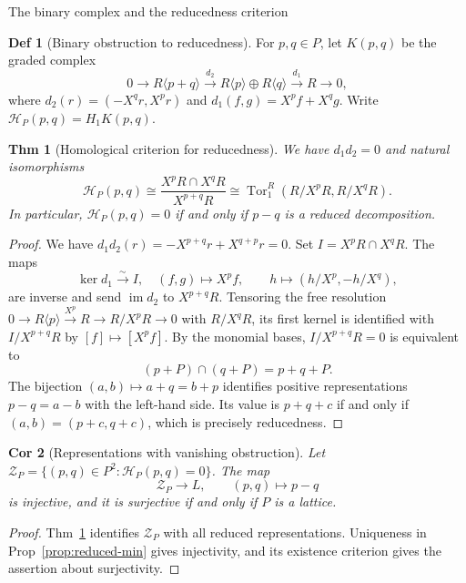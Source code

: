 \documentclass[10pt,letterpaper]{amsart}
\makeatletter
\numberwithin{equation}{section}
\newtheorem{thm}{Thm}[section]
\newtheorem{cor}[thm]{Cor}
\theoremstyle{definition}
\newtheorem{defn}{Def}[section]
\newcommand{\Tor}{\operatorname{Tor}}
\newcommand{\sh}[1]{\langle #1\rangle}
\newcommand{\HH}{\mathcal H}
\def\subsection{\@startsection{subsection}{2}
  \z@{.9\linespacing\@plus.3\linespacing}{.4\linespacing}
  {\normalfont\fontsize{11.5}{14}\selectfont\bfseries\boldmath\raggedright}}
\makeatother
\begin{document}
\subsection{The binary complex and the reducedness criterion}
\begin{defn}[Binary obstruction to reducedness]\label{def:binary}
For $p,q\in P$, let $K(p,q)$ be the graded complex
\[
0\longrightarrow R\sh{p+q}
\xrightarrow{\ d_2\ }R\sh p\oplus R\sh q
\xrightarrow{\ d_1\ }R\longrightarrow0,
\]
where $d_2(r)=(-X^qr,X^pr)$ and $d_1(f,g)=X^pf+X^qg$. Write $\HH_P(p,q)=H_1K(p,q)$.
\end{defn}

\begin{thm}[Homological criterion for reducedness]\label{thm:binary}
We have $d_1d_2=0$ and natural isomorphisms
\[
\HH_P(p,q)\cong
\frac{X^pR\cap X^qR}{X^{p+q}R}
\cong\Tor_1^R(R/X^pR,R/X^qR).
\]
In particular, $\HH_P(p,q)=0$ if and only if $p-q$ is a reduced decomposition.
\end{thm}
\begin{proof}
We have $d_1d_2(r)=-X^{p+q}r+X^{q+p}r=0$. Set $I=X^pR\cap X^qR$. The maps
\[
\ker d_1\xrightarrow{\sim} I,\quad(f,g)\mapsto X^pf,
\qquad h\mapsto(h/X^p,-h/X^q),
\]
are inverse and send $\operatorname{im}d_2$ to $X^{p+q}R$.
Tensoring the free resolution $0\to R\sh p\xrightarrow{X^p}R\to R/X^pR\to0$ with $R/X^qR$, its first kernel is identified with $I/X^{p+q}R$ by $[f]\mapsto[X^pf]$.
By the monomial bases, $I/X^{p+q}R=0$ is equivalent to
\[
(p+P)\cap(q+P)=p+q+P.
\]
The bijection $(a,b)\mapsto a+q=b+p$ identifies positive representations $p-q=a-b$ with the left-hand side. Its value is $p+q+c$ if and only if $(a,b)=(p+c,q+c)$, which is precisely reducedness.
\end{proof}

\begin{cor}[Representations with vanishing obstruction]\label{cor:zero-pairs}
Let $\mathcal Z_P=\{(p,q)\in P^2:\HH_P(p,q)=0\}$. The map
\[
\mathcal Z_P\longrightarrow L,\qquad(p,q)\longmapsto p-q
\]
is injective, and it is surjective if and only if $P$ is a lattice.
\end{cor}
\begin{proof}
Thm~\ref{thm:binary} identifies $\mathcal Z_P$ with all reduced representations. Uniqueness in Prop~\ref{prop:reduced-min} gives injectivity, and its existence criterion gives the assertion about surjectivity.
\end{proof}
\end{document}
